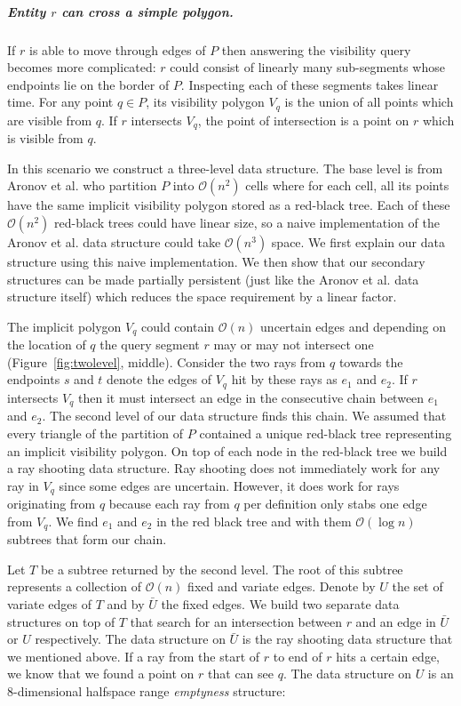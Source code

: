 \documentclass[UKenglish]{lipics-v2019}
\newcommand{\etal}{\textnormal{et al.}\xspace}
\begin{document}
\subparagraph{Entity $r$ can cross a simple polygon.}
If $r$ is able to move through edges of $P$ then answering the visibility query becomes more complicated: $r$ could consist of linearly many sub-segments whose endpoints lie on the border of $P$. Inspecting each of these segments takes linear time. For any point $q \in P$, its visibility polygon $V_q$ is the union of all points which are visible from $q$. If $r$ intersects $V_q$, the point of intersection is a point on $r$ which is visible from $q$. 

In this scenario we construct a three-level data structure. The base level is from Aronov \etal who partition $P$ into $\mathcal{O}(n^2)$ cells where for each cell, all its points have the same implicit visibility polygon stored as a red-black tree. Each of these $\mathcal{O}(n^2)$ red-black trees could have linear size, so a naive implementation of the Aronov \etal data structure could take $\mathcal{O}(n^3)$ space. We first explain our data structure using this naive implementation. We then show that our secondary structures can be made partially persistent (just like the Aronov \etal data structure itself) which reduces the space requirement by a linear factor.

The implicit polygon $V_q$ could contain $\mathcal{O}(n)$ uncertain edges and depending on the location of $q$ the query segment $r$ may or may not intersect one (Figure~\ref{fig:twolevel}, middle). Consider the two rays from $q$ towards the endpoints $s$ and $t$ denote the edges of $V_q$ hit by these rays as $e_1$ and $e_2$. If $r$ intersects $V_q$ then it must intersect an edge in the consecutive chain between $e_1$ and $e_2$. The second level of our data structure finds this chain. We assumed that every triangle of the partition of $P$ contained a unique red-black tree representing an implicit visibility polygon. On top of each node in the red-black tree we build a ray shooting data structure. Ray shooting does not immediately work for any ray in $V_q$ since some edges are uncertain. However, it does work for rays originating from $q$ because each ray from $q$ per definition only stabs one edge from $V_q$.  We find $e_1$ and $e_2$ in the red black tree and with them $\mathcal{O}(\log n)$ subtrees that form our chain.

Let $T$ be a subtree returned by the second level. The root of this subtree represents a collection of $\mathcal{O}(n)$ fixed and variate edges. Denote by $U$ the set of variate edges of $T$ and by $\bar{U}$ the fixed edges. We build two separate data structures on top of $T$ that search for an intersection between $r$ and an edge in $\bar{U}$ or $U$ respectively. The data structure on $\bar{U}$ is the ray shooting data structure that we mentioned above. If a ray from the start of $r$ to end of $r$ hits a certain edge, we know that we found a point on $r$ that can see $q$. The data structure on $U$ is an $8$-dimensional halfspace range \emph{emptyness} structure: 
\end{document}
